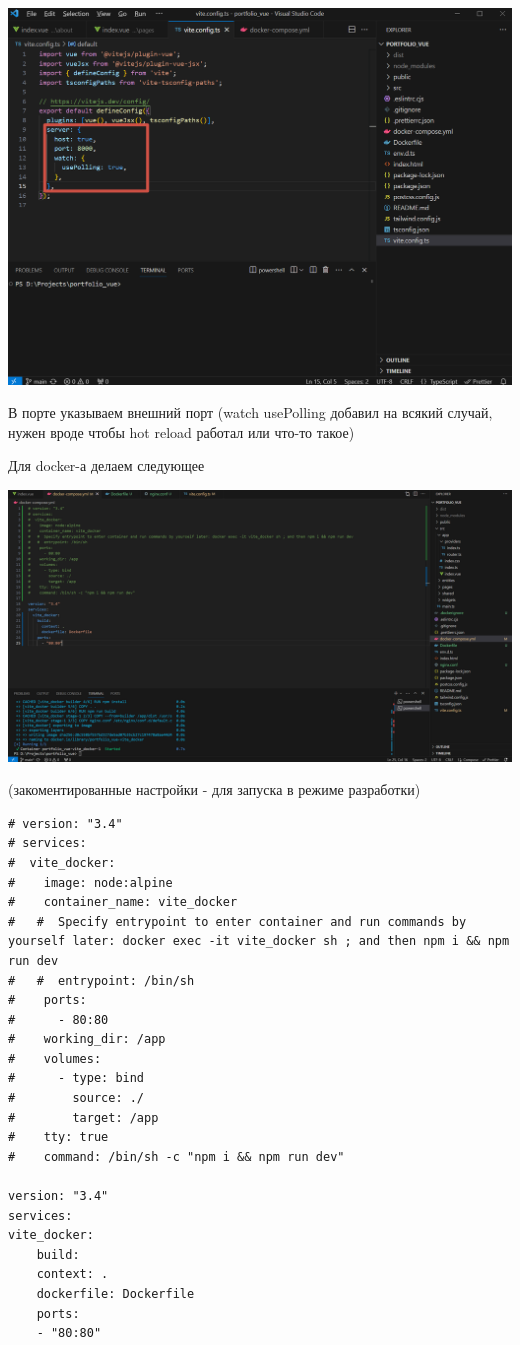 \documentclass[14pt, a4paper]{extarticle}
\begin{document}
\includegraphics*[width=0.8\linewidth]{img/2024-02-17-20-12-31.png}

В порте указываем внешний порт (watch usePolling добавил на всякий случай, нужен вроде чтобы hot reload работал или что-то такое)

Для docker-а делаем следующее

\includegraphics*[width=0.8\linewidth]{img/2024-02-18-15-19-07.png}

(закоментированные настройки - для запуска в режиме разработки)

\begin{lstlisting}
# version: "3.4"
# services:
#  vite_docker:
#    image: node:alpine
#    container_name: vite_docker
#   #  Specify entrypoint to enter container and run commands by yourself later: docker exec -it vite_docker sh ; and then npm i && npm run dev
#   #  entrypoint: /bin/sh
#    ports:
#      - 80:80
#    working_dir: /app
#    volumes:
#      - type: bind
#        source: ./
#        target: /app
#    tty: true
#    command: /bin/sh -c "npm i && npm run dev"

version: "3.4"
services:
vite_docker:
    build:
    context: .
    dockerfile: Dockerfile
    ports:
    - "80:80"
\end{lstlisting}
\end{document}
